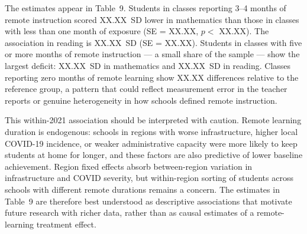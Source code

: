 The estimates appear in Table~9. Students in classes reporting 3--4
months of remote instruction scored XX.XX~SD lower in mathematics than
those in classes with less than one month of exposure (SE = XX.XX,
$p < $ XX.XX). %
The association in reading is XX.XX~SD (SE = XX.XX). %
Students in classes with five or more months of remote instruction ---
a small share of the sample --- show the largest deficit: XX.XX~SD in
mathematics and XX.XX~SD in reading. %
Classes reporting zero months of remote learning show XX.XX %
differences relative to the reference group, a pattern that could
reflect measurement error in the teacher reports or genuine
heterogeneity in how schools defined remote instruction.

This within-2021 association should be interpreted with caution.
Remote learning duration is endogenous: schools in regions with worse
infrastructure, higher local COVID-19 incidence, or weaker
administrative capacity were more likely to keep students at home
for longer, and these factors are also predictive of lower baseline
achievement. Region fixed effects absorb between-region variation in
infrastructure and COVID severity, but within-region sorting of students
across schools with different remote durations remains a concern.
The estimates in Table~9 are therefore best understood as descriptive
associations that motivate future research with richer data, rather
than as causal estimates of a remote-learning treatment effect.
